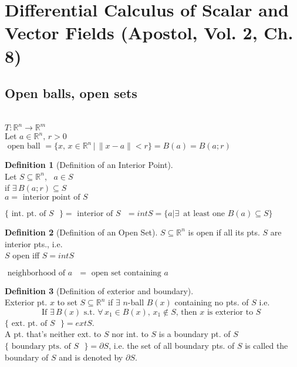 \documentclass[twoside]{amsart}
\theoremstyle{plain}
\theoremstyle{definition}
\newtheorem{definition}{Definition}
\begin{document}
\section{ Differential Calculus of Scalar and Vector Fields (Apostol, Vol. 2, Ch. 8) }

\subsection{Open balls, open sets} \quad \\

$T: \mathbb{R}^n \to \mathbb{R}^m$ \\
Let $a \in \mathbb{R}^n, \, r > 0$ \medskip \\
$\text{ open ball } = \{ x, \, x \in \mathbb{R}^n \, | \,  \| x - a \| < r \} = B(a) = B(a;r)$

\begin{definition}[Definition of an Interior Point] \quad \\
  Let $S \subseteq \mathbb{R}^n$, \, $a \in S$ \\
  \phantom{ Let S } if $\exists \, B(a;r) \subseteq S$ \medskip \\
  \phantom{ Let S if E } $a= \text{ interior point of $S$ } $
\end{definition}
$\{ \text{ int. pt. of $S$ } \} = \text{ interior of $S$ } = int{S} = \{ a | \exists \, \text{ at least one } B(a) \subseteq S \}$

\begin{definition}[Definition of an Open Set]
  $S \subseteq \mathbb{R}^n$ is open if all its pts. $S$ are interior pts., i.e. \medskip \\
  $S$ open iff $S = int{S}$
\end{definition}

$\text{ neighborhood of $a$ } = \text{ open set containing $a$ }$ \medskip \\

\begin{definition}[Definition of exterior and boundary] \quad \\
Exterior pt. $x$ to set $S \subseteq \mathbb{R}^n$ if $\exists$ $n$-ball $B(x)$ containing no pts. of $S$ i.e. 
\[
\text{ If $\exists \, B(x)$ s.t. $\forall \, x_1 \in B(x), \, x_1 \notin S$, then $x$ is exterior to $S$ } 
\]
$\{ \text{ ext. pt. of $S$ } \} = ext{S}$.  \medskip \\

A pt. that's neither ext. to $S$ nor int. to $S$ is a boundary pt. of $S$ \\
$\{ \text{ boundary pts. of $S$ } \} = \partial S$, i.e. the set of all boundary pts. of $S$ is called the boundary of $S$ and is denoted by $\partial S$.  
\end{definition}
\end{document}
